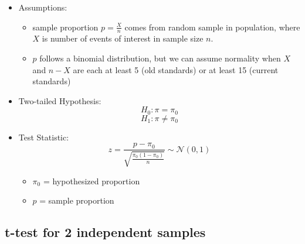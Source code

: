 \documentclass[]{book}
\providecommand{\tightlist}{%
  \setlength{\itemsep}{0pt}\setlength{\parskip}{0pt}}
\begin{document}
\begin{itemize}
\item
  Assumptions:

  \begin{itemize}
  \tightlist
  \item
    sample proportion \(p = \frac{X}{n}\) comes from random sample in population, where \(X\) is number of events of interest in sample size \(n\).
  \item
    \(p\) follows a binomial distribution, but we can assume normality when \(X\) and \(n-X\) are each at least 5 (old standards) or at least 15 (current standards)
  \end{itemize}
\item
  Two-tailed Hypothesis:
  \[ H_0: \pi = \pi_0 \]
  \[ H_1: \pi \neq \pi_0 \]
\item
  Test Statistic:
  \[ z = \frac{p-\pi_0}{\sqrt{\frac{\pi_0 (1-\pi_0)}{n}}} \sim \mathcal{N}(0,1) \]

  \begin{itemize}
  \tightlist
  \item
    \(\pi_0\) = hypothesized proportion
  \item
    \(p\) = sample proportion
  \end{itemize}
\end{itemize}

\hypertarget{t-test-for-2-independent-samples}{%
\subsection{t-test for 2 independent samples}\label{t-test-for-2-independent-samples}}
\end{document}
